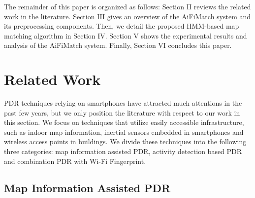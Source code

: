 \documentclass{llncs}
\begin{document}

The remainder of this paper is organized as follows: Section II reviews the related work in the literature. Section III gives an overview of the AiFiMatch system and its preprocessing components. Then, we detail the proposed HMM-based map matching algorithm in Section IV. Section V shows the experimental results and analysis of the AiFiMatch system. Finally, Section VI concludes this paper.

\section{Related Work}

PDR techniques relying on smartphones have attracted much attentions in the past few years, but we only position the literature with respect to our work in this section. We focus on techniques that utilize easily accessible infrastructure, such as indoor map information, inertial sensors embedded in smartphones and wireless access points in buildings. We divide these techniques into the following three categories: map information assisted PDR, activity detection based PDR and combination PDR with Wi-Fi Fingerprint. 

\subsection{Map Information Assisted PDR}
\end{document}
